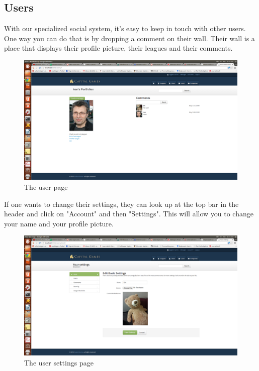 \subsection{Users}
With our specialized social system, it's easy to keep in touch with other users. One way you can do that is by dropping a comment on their wall. Their wall is a place that displays their profile picture, their leagues and their comments. 
\begin{figure}[H]
\centering
\includegraphics[width=5.5in]{./img/finalDesign/user.png}
\caption{The user page}
\end{figure}
If one wants to change their settings, they can look up at the top bar in the header and click on "Account" and then "Settings". This will allow you to change your name and your profile picture.
\begin{figure}[H]
\centering
\includegraphics[width=5.5in]{./img/finalDesign/usersettings.png}
\caption{The user settings page}
\end{figure}
